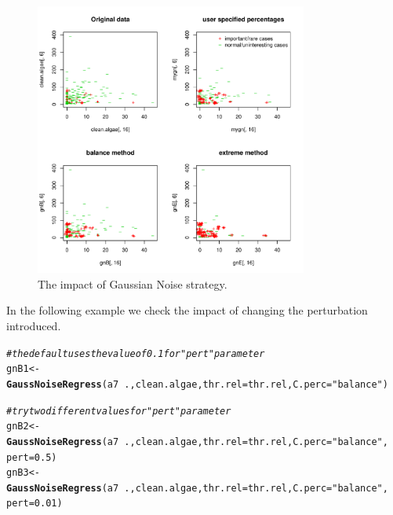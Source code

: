 \documentclass[10pt,a4paper]{article}\usepackage[]{graphicx}\usepackage[]{color}
\makeatletter
\newcommand{\hlnum}[1]{\textcolor[rgb]{0.686,0.059,0.569}{#1}}%
\newcommand{\hlstr}[1]{\textcolor[rgb]{0.192,0.494,0.8}{#1}}%
\newcommand{\hlcom}[1]{\textcolor[rgb]{0.678,0.584,0.686}{\textit{#1}}}%
\newcommand{\hlopt}[1]{\textcolor[rgb]{0,0,0}{#1}}%
\newcommand{\hlstd}[1]{\textcolor[rgb]{0.345,0.345,0.345}{#1}}%
\newcommand{\hlkwb}[1]{\textcolor[rgb]{0.69,0.353,0.396}{#1}}%
\newcommand{\hlkwc}[1]{\textcolor[rgb]{0.333,0.667,0.333}{#1}}%
\newcommand{\hlkwd}[1]{\textcolor[rgb]{0.737,0.353,0.396}{\textbf{#1}}}%
\newenvironment{kframe}{%
 \def\at@end@of@kframe{}%
 \ifinner\ifhmode%
  \def\at@end@of@kframe{\end{minipage}}%
  \begin{minipage}{\columnwidth}%
 \fi\fi%
 \def\FrameCommand##1{\hskip\@totalleftmargin \hskip-\fboxsep
 \colorbox{shadecolor}{##1}\hskip-\fboxsep
     \hskip-\linewidth \hskip-\@totalleftmargin \hskip\columnwidth}%
 \MakeFramed {\advance\hsize-\width
   \@totalleftmargin\z@ \linewidth\hsize
   \@setminipage}}%
 {\par\unskip\endMakeFramed%
 \at@end@of@kframe}
\newenvironment{knitrout}{}{} %
\makeatother
\begin{document}
\begin{knitrout}\footnotesize
{}\color{fgcolor}\begin{figure}

{\centering \includegraphics[width=0.8\textwidth]{figures/UBL-GN_plot2-1} 

}

\caption[The impact of Gaussian Noise strategy]{The impact of Gaussian Noise strategy.}\label{fig:GN_plot2}
\end{figure}


\end{knitrout}



In the following example we check the impact of changing the perturbation introduced.

\begin{knitrout}\footnotesize
{}\color{fgcolor}\begin{kframe}
\begin{alltt}
\hlcom{# the default uses the value of 0.1 for "pert" parameter}
\hlstd{gnB1} \hlkwb{<-} \hlkwd{GaussNoiseRegress}\hlstd{(a7}\hlopt{~}\hlstd{., clean.algae,} \hlkwc{thr.rel}\hlstd{=thr.rel,} \hlkwc{C.perc}\hlstd{=}\hlstr{"balance"}\hlstd{)}

\hlcom{# try two different values for "pert" parameter}
\hlstd{gnB2} \hlkwb{<-} \hlkwd{GaussNoiseRegress}\hlstd{(a7}\hlopt{~}\hlstd{., clean.algae,} \hlkwc{thr.rel}\hlstd{=thr.rel,} \hlkwc{C.perc}\hlstd{=}\hlstr{"balance"}\hlstd{,}
                          \hlkwc{pert}\hlstd{=}\hlnum{0.5}\hlstd{)}
\hlstd{gnB3} \hlkwb{<-} \hlkwd{GaussNoiseRegress}\hlstd{(a7}\hlopt{~}\hlstd{., clean.algae,} \hlkwc{thr.rel}\hlstd{=thr.rel,} \hlkwc{C.perc}\hlstd{=}\hlstr{"balance"}\hlstd{,}
                          \hlkwc{pert}\hlstd{=}\hlnum{0.01}\hlstd{)}
\end{alltt}
\end{kframe}
\end{knitrout}
\end{document}
